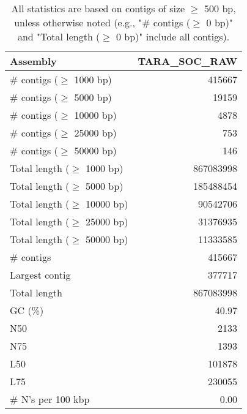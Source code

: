 \documentclass[12pt,a4paper]{article}
\begin{document}
\begin{table}[ht]
\begin{center}
\caption{All statistics are based on contigs of size $\geq$ 500 bp, unless otherwise noted (e.g., "\# contigs ($\geq$ 0 bp)" and "Total length ($\geq$ 0 bp)" include all contigs).}
\begin{tabular}{|l*{1}{|r}|}
\hline
Assembly & TARA\_SOC\_RAW \\ \hline
\# contigs ($\geq$ 1000 bp) & 415667 \\ \hline
\# contigs ($\geq$ 5000 bp) & 19159 \\ \hline
\# contigs ($\geq$ 10000 bp) & 4878 \\ \hline
\# contigs ($\geq$ 25000 bp) & 753 \\ \hline
\# contigs ($\geq$ 50000 bp) & 146 \\ \hline
Total length ($\geq$ 1000 bp) & 867083998 \\ \hline
Total length ($\geq$ 5000 bp) & 185488454 \\ \hline
Total length ($\geq$ 10000 bp) & 90542706 \\ \hline
Total length ($\geq$ 25000 bp) & 31376935 \\ \hline
Total length ($\geq$ 50000 bp) & 11333585 \\ \hline
\# contigs & 415667 \\ \hline
Largest contig & 377717 \\ \hline
Total length & 867083998 \\ \hline
GC (\%) & 40.97 \\ \hline
N50 & 2133 \\ \hline
N75 & 1393 \\ \hline
L50 & 101878 \\ \hline
L75 & 230055 \\ \hline
\# N's per 100 kbp & 0.00 \\ \hline
\end{tabular}
\end{center}
\end{table}
\end{document}
